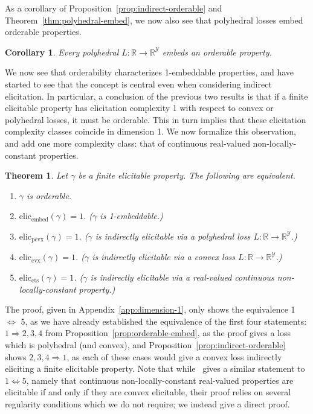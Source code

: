 \documentclass[12pt]{article}
\newcommand{\reals}{\mathbb{R}}
\newcommand{\eliccts}{\mathrm{elic}_\mathrm{cts}}
\newcommand{\eliccvx}{\mathrm{elic}_\mathrm{cvx}}
\newcommand{\elicpoly}{\mathrm{elic}_\mathrm{pcvx}}
\newcommand{\elicembed}{\mathrm{elic}_\mathrm{embed}}
\newcommand{\Y}{\mathcal{Y}}
\newtheorem{theorem}{Theorem}
\newtheorem{corollary}{Corollary}
\begin{document}
As a corollary of Proposition~\ref{prop:indirect-orderable} and Theorem~\ref{thm:polyhedral-embed}, we now also see that polyhedral losses embed orderable properties.

\begin{corollary}\label{cor:embed-orderable}
  Every polyhedral $L : \reals \to \reals^\Y$ embeds an orderable property.
\end{corollary}

We now see that orderability characterizes 1-embeddable properties, and have started to see that the concept is central even when considering indirect elicitation.
In particular, a conclusion of the previous two results is that if a finite elicitable property has elicitation complexity 1 with respect to convex or polyhedral losses, it must be orderable.
This in turn implies that these elicitation complexity classes coincide in dimension 1.
We now formalize this observation, and add one more complexity class: that of continuous real-valued non-locally-constant properties.

\begin{theorem}\label{thm:1d-tfae}
  Let $\gamma$ be a finite elicitable property.
  The following are equivalent.
  \begin{enumerate}\setlength{\itemsep}{0pt}
  \item $\gamma$ is orderable.
  \item $\elicembed(\gamma)=1$. ($\gamma$ is 1-embeddable.)
  \item $\elicpoly(\gamma)=1$. ($\gamma$ is indirectly elicitable via a polyhedral loss $L:\reals\to\reals^\Y$.)
  \item $\eliccvx(\gamma)=1$. ($\gamma$ is indirectly elicitable via a convex loss $L:\reals\to\reals^\Y$.)
  \item $\eliccts(\gamma)=1$. ($\gamma$ is indirectly elicitable via a real-valued continuous non-locally-constant property.)
  \end{enumerate}
\end{theorem}

The proof, given in Appendix~\ref{app:dimension-1}, only shows the equivalence 1 $\Leftrightarrow$ 5, as we have already established the equivalence of the first four statements: $1 \Rightarrow 2,3,4$ from Proposition~\ref{prop:orderable-embed}, as the proof gives a loss which is polyhedral (and convex), and Proposition~\ref{prop:indirect-orderable} shows $2,3,4 \Rightarrow 1$, as each of these cases would give a convex loss indirectly eliciting a finite elicitable property.
Note that while~\citet{finocchiaro2018convex} gives a similar statement to $1\Leftrightarrow 5$, namely that continuous non-locally-constant real-valued properties are elicitable if and only if they are convex elicitable, their proof relies on several regularity conditions which we do not require; we instead give a direct proof.
\end{document}
